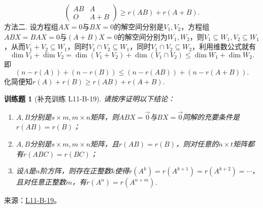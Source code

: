 \documentclass[UTF8,12pt,a4paper,fontset=fandol]{ctexart}
\newtheorem{exercise}{训练题}[section]
\begin{document}
\begin{solve}
\[\begin{pmatrix}
                  AB & A   \\
                  O  & A+B
              \end{pmatrix}\geqslant
              r(AB)+r(A+B). \]
          方法二. 设方程组$AX=0$与$BX=0$的解空间分别是$V_1, V_2$，方程组$ABX=BAX=0$与$(A+B)X=0$的解空间分别为$W_1, W_2$，则$V_1\subseteq W_1, V_2\subseteq W_1$，从而$V_1+V_2\subseteq W_1$，同时$V_1\cap V_2\subseteq W_1$，同时$V_1\cap V_2\subseteq W_2$，利用维数公式就有
          \[ \dim V_1+\dim V_2=\dim(V_1+V_2)+\dim(V_1\cap V_2)\leqslant \dim W_1+\dim W_2. \]
          即
          \[ (n-r(A))+(n-r(B))\leqslant (n-r(AB))+(n-r(A+B)). \]
          化简便知$r(A)+r(B)\geqslant r(AB)+r(A+B)$.
\end{solve}

\begin{exercise}[补充训练 L11-B-19]\label{prob:L11-B-19}
请按序证明以下结论：
        \begin{enumerate}
            \item $A,B$分别是$s \times m,m \times n$矩阵，则$ABX=\vec{0}$与$BX=\vec{0}$同解的充要条件是$r(AB)=r(B)$；

            \item $A,B$分别是$s \times m,m \times n$矩阵，且$r(AB)=r(B)$，则对任意的$n \times t$矩阵都有$r(ABC)=r(BC)$；

            \item 设$A$是$n$阶方阵，则存在正整数$k$使得$r(A^k)=r(A^{k+1})=r(A^{k+2})=\cdots$，且对任意正整数$m$，有$r(A^n)=r(A^{n+m})$.
        \end{enumerate}
\end{exercise}
\noindent 来源：\href{https://github.com/yhwu-is/Linear-Algebra-Left-Undone/blob/new/%E8%AE%B2%E4%B9%89/%E4%B8%93%E9%A2%98/11%20%E6%9C%9D%E8%8A%B1%E5%A4%95%E6%8B%BE.tex}{L11-B-19}。
\end{document}
